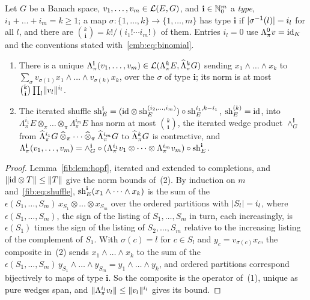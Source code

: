 \begin{lemma}\label{fmo:lem:multishuffle}
Let $G$ be a Banach space, $v_1,\dots,v_m\in\mathcal L(E,G)$, and $\mathbf i\in\mathbb N_0^m$ a \emph{type}, $i_1+\dots+i_m=k\ge1$; a map
$\sigma\colon\{1,\dots,k\}\to\{1,\dots,m\}$ has type $\mathbf i$ if $\lvert \sigma^{-1}(l)\rvert=i_l$ for all $l$, and there are
$\binom k{\mathbf i}=k!/(i_1!\cdots i_m!)$ of them. Entries $i_l=0$ use $\Lambda^0_\pi v=\mathrm{id}_K$ and the conventions stated
with~\eqref{cmb:eq:binomial}.
\begin{enumerate}
\item There is a unique $\Lambda^{\mathbf i}_\pi(v_1,\dots,v_m)\in\mathcal L(\Lambda^k_\pi E,\widehat\Lambda^k_\pi G)$ sending
$x_1\wedge\dots\wedge x_k$ to $\sum_\sigma v_{\sigma(1)}x_1\wedge\dots\wedge v_{\sigma(k)}x_k$, over the $\sigma$ of type
$\mathbf i$; its norm is at most $\binom k{\mathbf i}\prod_l\lVert v_l\rVert^{i_l}$.
\item The iterated shuffle $\operatorname{sh}^{\mathbf i}_E=(\mathrm{id}\otimes\operatorname{sh}^{(i_2,\dots,i_m)}_E)\circ\operatorname{sh}^{i_1,k-i_1}_E$, $\operatorname{sh}^{(k)}_E=\mathrm{id}$, into
$\Lambda^{i_1}_\pi E\otimes_\pi\dots\otimes_\pi\Lambda^{i_m}_\pi E$ has norm at most $\binom k{\mathbf i}$, the iterated wedge
product $\wedge^{\mathbf i}_G$ from $\hLambda^{i_1}_\pi G\hot_\pi\dots\hot_\pi\hLambda^{i_m}_\pi G$ to $\widehat\Lambda^k_\pi G$ is
contractive, and $\Lambda^{\mathbf i}_\pi(v_1,\dots,v_m)=\wedge^{\mathbf i}_G\circ(\Lambda^{i_1}_\pi v_1\otimes\dots\otimes
\Lambda^{i_m}_\pi v_m)\circ\operatorname{sh}^{\mathbf i}_E$.
\end{enumerate}
\end{lemma}

\begin{proof}
Lemma~\ref{fib:lem:hopf}, iterated and extended to completions, and $\lVert \mathrm{id}\otimes T\rVert\le\lVert T\rVert$ give the norm bounds
of~(2). By induction on $m$ and~\eqref{fib:eq:shuffle}, $\operatorname{sh}^{\mathbf i}_E(x_1\wedge\dots\wedge x_k)$ is the sum of the
$\epsilon(S_1,\dots,S_m)\,x_{S_1}\otimes\dots\otimes x_{S_m}$ over the ordered partitions with $\lvert S_l\rvert=i_l$, where
$\epsilon(S_1,\dots,S_m)$, the sign of the listing of $S_1,\dots,S_m$ in turn, each increasingly, is $\epsilon(S_1)$ times
the sign of the listing of $S_2,\dots,S_m$ relative to the increasing listing of the complement of $S_1$. With
$\sigma(c)=l$ for $c\in S_l$ and $y_c=v_{\sigma(c)}x_c$, the composite in~(2) sends $x_1\wedge\dots\wedge x_k$ to the sum of
the $\epsilon(S_1,\dots,S_m)\,y_{S_1}\wedge\dots\wedge y_{S_m}=y_1\wedge\dots\wedge y_k$, and ordered partitions correspond
bijectively to maps of type $\mathbf i$. So the composite is the operator of~(1), unique as pure wedges span, and
$\lVert \Lambda^{i_l}_\pi v_l\rVert\le\lVert v_l\rVert^{i_l}$ gives its bound.
\end{proof}

